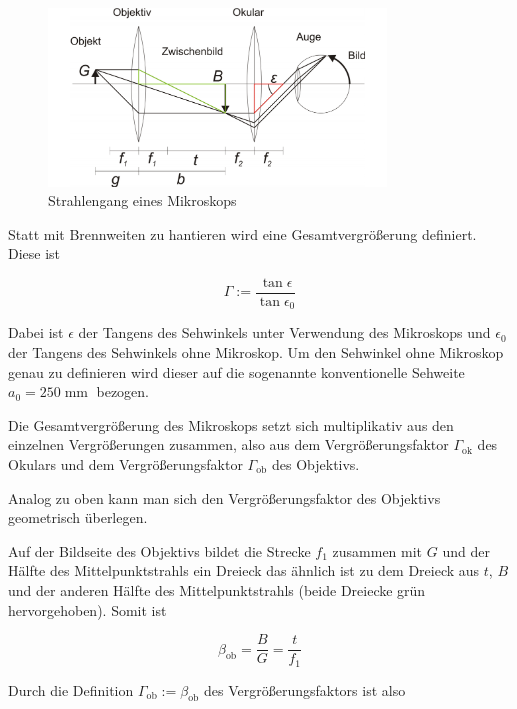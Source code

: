 \documentclass[a4paper,german,12pt,smallheadings]{scrartcl}
\begin{document}
\begin{figure}[h!]
    \centering
    \includegraphics[width=0.8\textwidth]{mikroskop.png}
    \caption{Strahlengang eines Mikroskops}
    \label{fig:mikroskop}
\end{figure}

Statt mit Brennweiten zu hantieren wird eine Gesamtvergrößerung definiert.
Diese ist

\begin{equation}
  \Gamma := \frac{\tan \epsilon}{\tan \epsilon_0}
\end{equation}

Dabei ist $\epsilon$ der Tangens des Sehwinkels unter Verwendung des Mikroskops
und $\epsilon_0$ der Tangens des Sehwinkels ohne Mikroskop. Um den Sehwinkel
ohne Mikroskop genau zu definieren wird dieser auf die sogenannte
konventionelle Sehweite $a_0 = 250 \operatorname{mm}$ bezogen.

Die Gesamtvergrößerung des Mikroskops setzt sich multiplikativ aus den
einzelnen Vergrößerungen zusammen, also aus dem Vergrößerungsfaktor
$\Gamma_\text{ok}$ des Okulars und dem Vergrößerungsfaktor $\Gamma_\text{ob}$
des Objektivs.

Analog zu oben kann man sich den Vergrößerungsfaktor des Objektivs geometrisch
überlegen.

Auf der Bildseite des Objektivs bildet die Strecke $f_1$ zusammen mit $G$ und
der Hälfte des Mittelpunktstrahls ein Dreieck das ähnlich ist zu dem Dreieck
aus $t$, $B$ und der anderen Hälfte des Mittelpunktstrahls (beide Dreiecke grün
hervorgehoben). Somit ist

\begin{equation}
  \beta_\text{ob} = \frac{B}{G} = \frac{t}{f_1}
  \label{eq:vergr_zw}
\end{equation}

Durch die Definition $\Gamma_\text{ob} := \beta_\text{ob}$ des
Vergrößerungsfaktors ist also
\end{document}
